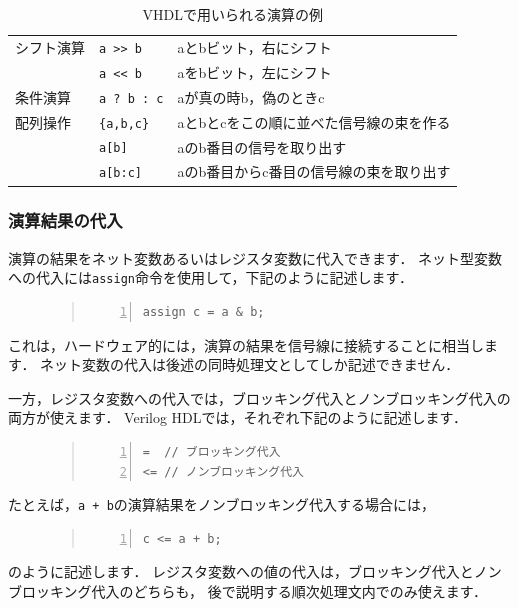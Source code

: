 \documentclass[a4paper,dvipdfmx]{jsarticle}
\begin{document}
\begin{table}[H]
\begin{center}
\begin{tabular}{l|l|l}
   シフト演算    & \verb|a >> b|    & aとbビット，右にシフト \\\cline{2-3}
                 & \verb|a << b|    & aをbビット，左にシフト \\\hline
   条件演算      & \verb|a ? b : c| & aが真の時b，偽のときc \\\hline
   配列操作      & \verb|{a,b,c}|   & aとbとcをこの順に並べた信号線の束を作る \\\cline{2-3}
                 & \verb|a[b] |     & aのb番目の信号を取り出す \\\cline{2-3}
                 & \verb|a[b:c]|    & aのb番目からc番目の信号線の束を取り出す \\\hline
 \end{tabular}
\end{center}
\caption{VHDLで用いられる演算の例\label{tbl:vhdl_operator}}
\end{table}

\subsubsection{演算結果の代入}
演算の結果をネット変数あるいはレジスタ変数に代入できます．
ネット型変数への代入には\verb|assign|命令を使用して，下記のように記述します．
\begin{figure}[H]
\begin{quote}
\begin{Verbatim}[frame=single, numbers=left, baselinestretch=0.8]
assign c = a & b;
\end{Verbatim}
\end{quote}
\end{figure}
これは，ハードウェア的には，演算の結果を信号線に接続することに相当します．
ネット変数の代入は後述の同時処理文としてしか記述できません．

一方，レジスタ変数への代入では，ブロッキング代入とノンブロッキング代入の両方が使えます．
Verilog HDLでは，それぞれ下記のように記述します．
\begin{figure}[H]
\begin{quote}
\begin{Verbatim}[frame=single, numbers=left, baselinestretch=0.8]
=  // ブロッキング代入
<= // ノンブロッキング代入
\end{Verbatim}
\end{quote}
\end{figure}
たとえば，\verb|a + b|の演算結果をノンブロッキング代入する場合には，
\begin{figure}[H]
\begin{quote}
\begin{Verbatim}[frame=single, numbers=left, baselinestretch=0.8]
c <= a + b;
\end{Verbatim}
\end{quote}
\end{figure}
のように記述します．
レジスタ変数への値の代入は，ブロッキング代入とノンブロッキング代入のどちらも，
後で説明する順次処理文内でのみ使えます．
\end{document}
